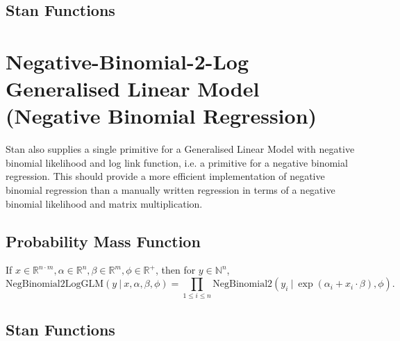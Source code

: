 \begin{description}
{\begin{description}


\subsection{Stan Functions}


\begin{description}       \end{description}


\section{Negative-Binomial-2-Log Generalised Linear Model (Negative Binomial Regression)}\label{neg-binom-2-log-glm.section}


Stan also supplies a single primitive for a Generalised Linear Model with negative binomial likelihood and log link function, i.e. a primitive for a negative binomial regression. This should provide a more efficient implementation of negative binomial regression than a manually written regression in terms of a negative binomial likelihood and matrix multiplication.


\subsection{Probability Mass Function}


If $x\in \mathbb{R}^{n\cdot m}, \alpha \in \mathbb{R}^n, \beta\in \mathbb{R}^m, \phi\in \mathbb{R}^+$, then for $y \in \mathbb{N}^n$, \[ \text{NegBinomial2LogGLM}(y~|~x, \alpha, \beta, \phi) = \prod_{1\leq i \leq n}\text{NegBinomial2}(y_i~|~\exp(\alpha_i + x_i\cdot \beta), \phi). \] 



\subsection{Stan Functions}



\end{description}}
\end{description}
